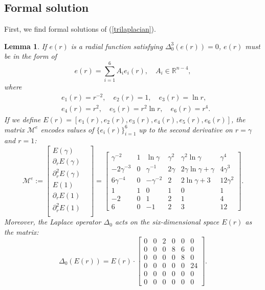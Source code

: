 \documentclass[11pt,letterpaper]{amsart}
\newcommand{\mM}{\mathcal{M}}
\newcommand{\bR}{\mathbb{R}}
\newtheorem{lemma}[theorem]{Lemma}
\theoremstyle{definition}
\theoremstyle{remark}
\numberwithin{equation}{section}
\begin{document}
\subsection{Formal solution}\label{formal-solution}
First, we find formal solutions of (\ref{trilaplacian}).
\begin{lemma}\label{e}
    If $e(r)$ is a radial function satisfying $\Delta_0^3 (e(r))=0$, $e(r)$ must be in the form of
    \begin{equation}
        e(r)=\sum_{i=1}^{6}A_i e_i(r), \quad A_i\in \bR^{n-4},
    \end{equation}
where
\begin{equation*}
    \begin{split}
        &e_1(r)=r^{-2}, \quad e_2(r)=1, \quad e_3(r)=\ln r,\\
        &e_4(r)=r^2, \quad e_5(r)=r^2\ln r, \quad e_6(r)=r^4.
    \end{split}
\end{equation*}
If we define $E(r)=[e_1(r), e_2(r), e_3(r), e_4(r), e_5(r), e_6(r)]$, the matrix $\mM^{e}$ encodes values of $\{e_i(r)\}_{i=1}^{6}$ up to the second derivative on $r=\gamma$ and $r=1$:
\begin{equation}\label{Me}
\mM^{e}:=\begin{bmatrix}
    E(\gamma) &\\
    \partial_r E(\gamma) &\\
    \partial^2_r E(\gamma) &\\
    E(1) &\\
    \partial_r E(1) &\\
    \partial^2_r E(1) &\\
\end{bmatrix}=\begin{bmatrix}
\gamma^{-2} & 1 & \ln \gamma & \gamma^2 & \gamma^2\ln \gamma& \gamma^4\\
-2\gamma^{-3} & 0 & \gamma^{-1} & 2\gamma & 2\gamma\ln \gamma+\gamma& 4\gamma^3\\
6\gamma^{-4} & 0 & - \gamma^{-2} & 2 & 2\ln \gamma+3& 12\gamma^2\\
1 & 1 & 0 & 1 & 0& 1\\
-2 & 0 & 1 & 2 & 1& 4\\
6 & 0 & -1 & 2 & 3& 12
\end{bmatrix}.
\end{equation}
Moreover, the Laplace operator $\Delta_0$ acts on the six-dimensional space $E(r)$ as the matrix:
\begin{equation}\label{eLaplace}
    \Delta_0(E(r))=E(r)\cdot 
    \begin{bmatrix}
0 & 0 & 2 & 0 & 0& 0\\
0 & 0 & 0 & 8 & 6& 0\\
0 & 0 & 0 & 0 & 8& 0\\
0 & 0 & 0 & 0 & 0& 24\\
0 & 0 & 0 & 0 & 0& 0\\
0 & 0 & 0 & 0 & 0& 0
\end{bmatrix}.
\end{equation}
\end{lemma}
\end{document}
